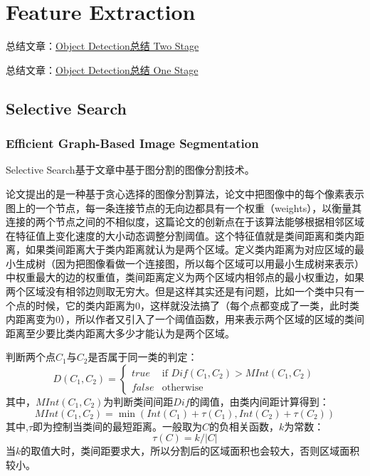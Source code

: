 \chapter{Feature Extraction}

总结文章：\href{https://zhuanlan.zhihu.com/p/35724768}{Object Detection总结 Two Stage}

总结文章：\href{https://zhuanlan.zhihu.com/p/35731743}{Object Detection总结 One Stage}

\section{Selective Search}

\subsection{Efficient Graph-Based Image Segmentation}

Selective Search基于文章\cite{Felzenszwalb2004}中基于图分割的图像分割技术。

论文\cite{Felzenszwalb2004}提出的是一种基于贪心选择的图像分割算法，论文中把图像中的每个像素表示图上的一个节点，每一条连接节点的无向边都具有一个权重（weights），以衡量其连接的两个节点之间的不相似度，这篇论文的创新点在于该算法能够根据相邻区域在特征值上变化速度的大小动态调整分割阈值。这个特征值就是类间距离和类内距离，如果类间距离大于类内距离就认为是两个区域。定义类内距离为对应区域的最小生成树（因为把图像看做一个连接图，所以每个区域可以用最小生成树来表示）中权重最大的边的权重值，类间距离定义为两个区域内相邻点的最小权重边，如果两个区域没有相邻边则取无穷大。但是这样其实还是有问题，比如一个类中只有一个点的时候，它的类内距离为0，这样就没法搞了（每个点都变成了一类，此时类内距离变为0），所以作者又引入了一个阈值函数，用来表示两个区域的区域的类间距离至少要比类内距离大多少才能认为是两个区域。

判断两个点$C_1$与$C_2$是否属于同一类的判定：
\begin{displaymath}
D(C_1, C_2) = 
\begin{cases}
true & \text{if } Dif(C_1, C_2) > M Int(C_1, C_2)\\
false & \text{otherwise}
\end{cases}
\end{displaymath}
其中，$MInt(C_1, C_2)$为判断类间间距$Dif$的阈值，由类内间距计算得到：
\begin{displaymath}
M Int(C_1, C_2) = \min (Int(C_1) + \tau (C_1), Int(C_2) + \tau (C_2) )
\end{displaymath}
其中,$\tau$即为控制当类间的最短距离。一般取为$C$的负相关函数，$k$为常数：
\[
\tau(C) = k / |C|
\]
当$k$的取值大时，类间距要求大，所以分割后的区域面积也会较大，否则区域面积较小。

